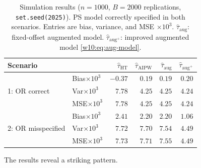 \documentclass[master.tex]{subfiles}
\begin{document}
\begin{table}[h]
\centering
\caption{Simulation results ($n=1000$, $B=2000$ replications,
\texttt{set.seed(2025)}).  PS model correctly specified in both
scenarios.  Entries are bias, variance, and MSE $\times 10^{3}$.
$\hat\tau_{\mathrm{aug}}$: fixed-offset augmented model.
$\hat\tau_{\mathrm{aug}^+}$: improved augmented model
\eqref{w10:eq:aug-model}.}
\label{w10:tab:sim}
\renewcommand{\arraystretch}{1.3}
\begin{tabular}{llrrrr}
\hline
Scenario & & $\hat\tau_{\mathrm{HT}}$ &
             $\hat\tau_{\mathrm{AIPW}}$ &
             $\hat\tau_{\mathrm{aug}}$ &
             $\hat\tau_{\mathrm{aug}^+}$ \\
\hline
\multirow{3}{*}{1: OR correct}
  & Bias$\times 10^3$     & $-0.37$ & $0.19$          & $0.19$          & $0.20$ \\
  & Var$\times 10^3$      & $7.78$  & $4.25$          & $4.25$          & $4.24$ \\
  & MSE$\times 10^3$      & $7.78$  & $4.25$          & $4.25$          & $4.24$ \\[4pt]
\multirow{3}{*}{2: OR misspecified}
  & Bias$\times 10^3$     & $2.41$  & $2.20$          & $2.20$          & $1.06$ \\
  & Var$\times 10^3$      & $7.72$  & $7.70$          & $7.54$          & $4.49$ \\
  & MSE$\times 10^3$      & $7.73$  & $7.71$          & $7.55$          & $4.49$ \\
\hline
\end{tabular}
\end{table}

\noindent The results reveal a striking pattern.
\end{document}

